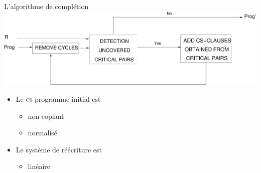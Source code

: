\documentclass[xcolor={dvipsnames}]{beamer}
\newcommand{\csprogramme}{\textsc{cs}-programme\xspace}
\begin{document}
\begin{frame}{L'algorithme de complétion}
  \includegraphics[width=\linewidth]{media/schema.pdf}\\
  \begin{itemize}[<+->]
  \item Le \csprogramme initial est
    \begin{itemize}
      \item non copiant
      \item normalisé
    \end{itemize}
    \vspace{\baselineskip}
  \item Le système de réécriture est
    \begin{itemize}
      \item linéaire
    \end{itemize}
  \end{itemize}
\end{frame}
\end{document}
